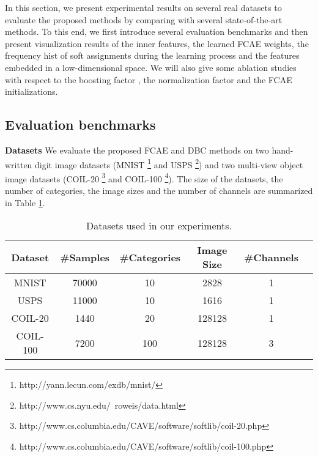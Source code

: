 \documentclass[preprint,12pt]{elsarticle}
\begin{document}
In this section, we present experimental results on several real datasets to evaluate the proposed methods
by comparing with several state-of-the-art methods. To this end, we first introduce several evaluation benchmarks
and then present visualization results of the inner features, the learned FCAE weights, the frequency hist of
soft assignments during the learning process and the features embedded in a low-dimensional space.
We will also give some ablation studies with respect to the boosting factor , the normalization factor 
and the FCAE initializations.



\subsection{Evaluation benchmarks}

\textbf{Datasets} We evaluate the proposed FCAE and DBC methods on two hand-written digit image datasets
(MNIST \footnote{http://yann.lecun.com/exdb/mnist/} and USPS \footnote{http://www.cs.nyu.edu/~roweis/data.html})
and two multi-view object image datasets (COIL-20 \footnote{http://www.cs.columbia.edu/CAVE/software/softlib/coil-20.php}
and COIL-100 \footnote{http://www.cs.columbia.edu/CAVE/software/softlib/coil-100.php}).
The size of the datasets, the number of categories, the image sizes and the number of channels are summarized
in Table \ref{tab:dataset}.

\begin{table}[!bht]
\begin{scriptsize}
\caption{Datasets used in our experiments.}
\label{tab:dataset}
\begin{center}
\begin{tabular}{cccccc}
\toprule
Dataset & \#Samples & \#Categories & Image Size & \#Channels \\
\midrule
MNIST       & 70000 & 10 & 2828 & 1 \\
USPS        & 11000 & 10 & 1616 & 1 \\
COIL-20     & 1440  & 20 & 128128 & 1 \\
COIL-100    & 7200  & 100 & 128128 & 3 \\
\bottomrule
\end{tabular}
\end{center}
\end{scriptsize}
\end{table}
\end{document}

